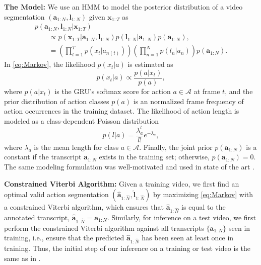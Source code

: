 \documentclass[10pt,twocolumn,letterpaper]{article}
\begin{document}
{\bf The Model:} We use an HMM to model the posterior distribution of a video segmentation $(\bm{a}_{1:N}, \bm{l}_{1:N})$ given  $\bm{x}_{1:T}$ as
\begin{equation}
\begin{array}{l}
p(\bm{a}_{1:N}, \bm{l}_{1:N}|\bm{x}_{1:T})   \\ \quad \quad \propto p(\bm{x}_{1:T}|\bm{a}_{1:N}, \bm{l}_{1:N})p(\bm{l}_{1:N}|\bm{a}_{1:N})p(\bm{a}_{1:N}) , \\ \quad \quad
   = \displaystyle \left(\prod_{t=1}^{T} p(x_t|a_{n(t)})\right) \left(\prod_{n=1}^{N}  p(l_n| a_n) \right) p(\bm{a}_{1:N}).
   \end{array}
   \label{eq:Markov}
\end{equation}
In \eqref{eq:Markov}, the likelihood $p(x_t|a)$ is estimated as
\begin{equation}
    p(x_t|a) \propto \frac{p(a|x_t)}{p(a)},
    \label{eq:framelikelihood}
\end{equation}
where $p(a|x_t)$ is the GRU's softmax score for action $a\in \mathcal{A}$ at frame $t$, and the prior distribution of action classes $p(a)$ is an normalized frame frequency of action occurrences in the training dataset. The likelihood of action length is modeled as a class-dependent Poisson distribution 
\begin{equation}
    p(l|a) = \frac{\lambda_{a}^{l} }{l!}e^{-\lambda_{a}} , 
    \label{eq:Poisson}
\end{equation}
where $\lambda_{a}$ is the mean length for class $a\in \mathcal{A}$. Finally, the joint prior $p(\bm{a}_{1:N})$ is a constant if the transcript $\bm{a}_{1:N}$ exists in the training set; otherwise, $p(\bm{a}_{1:N})=0$. The same modeling formulation was well-motivated and used in state of the art \cite{richard2018neuralnetwork}.


{\bf Constrained Viterbi Algorithm:} Given a training video, we first find an optimal valid action segmentation $(\hat{\bm{a}}_{1:\hat{N}}, \hat{\bm{l}}_{1:\hat{N}})$ by maximizing \eqref{eq:Markov} with a constrained Viterbi algorithm, which ensures that $\hat{\bm{a}}_{1:\hat{N}}$ is equal to the annotated transcript, $\hat{\bm{a}}_{1:\hat{N}}=\bm{a}_{1:N}$. Similarly, for inference on a test video, we first perform the constrained Viterbi algorithm against all transcripts $\{\bm{a}_{1:N}\}$ seen in training, i.e., ensure that the predicted $\hat{\bm{a}}_{1:\hat{N}}$ has been seen at least once in training. Thus, the initial step of our inference on a training or test video is the same as in \cite{richard2018neuralnetwork}.
\end{document}
